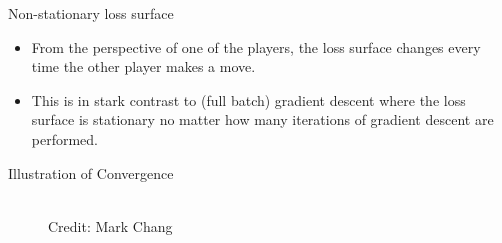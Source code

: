 \begin{frame} {Non-stationary loss surface}
   \begin{itemize}
     \item %
     From the perspective of one of the players, the loss surface changes every time the other player makes a move.
  \vspace{2mm}
     \item This is in stark contrast to  (full batch) gradient descent where the loss surface is stationary no matter how many iterations of gradient descent are performed.

   \end{itemize}
 \end{frame}

\begin{frame} {Illustration of Convergence}
  \begin{figure}
    \centering
      \tiny{\\Credit: Mark Chang}
  \end{figure}
\end{frame}

